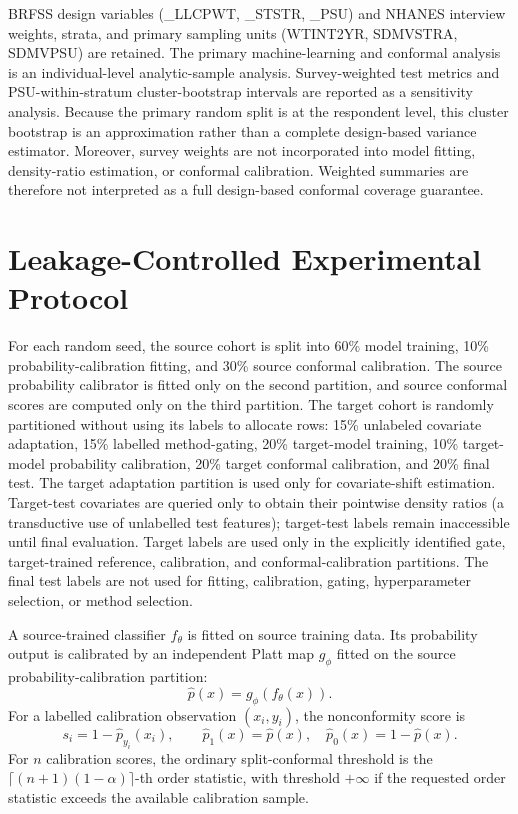 BRFSS design variables (_LLCPWT, _STSTR, _PSU) and NHANES interview weights,
strata, and primary sampling units (WTINT2YR, SDMVSTRA, SDMVPSU) are retained.
The primary machine-learning and conformal analysis is an individual-level
analytic-sample analysis. Survey-weighted test metrics and PSU-within-stratum
cluster-bootstrap intervals are reported as a sensitivity analysis. Because
the primary random split is at the respondent level, this cluster bootstrap is
an approximation rather than a complete design-based variance estimator.
Moreover, survey weights are not incorporated into model fitting,
density-ratio estimation, or conformal calibration. Weighted summaries are
therefore not interpreted as a full design-based conformal coverage guarantee.

\section{Leakage-Controlled Experimental Protocol}
\label{sec:protocol}

For each random seed, the source cohort is split into 60\% model training,
10\% probability-calibration fitting, and 30\% source conformal calibration.
The source probability calibrator is fitted only on the second partition, and
source conformal scores are computed only on the third partition. The target
cohort is randomly partitioned without using its labels to allocate rows:
15\% unlabeled covariate adaptation, 15\% labelled method-gating, 20\%
target-model training, 10\% target-model probability calibration, 20\%
target conformal calibration, and 20\% final test. The target adaptation
partition is used only for covariate-shift estimation. Target-test covariates are
queried only to obtain their pointwise density ratios (a transductive use of
unlabelled test features); target-test labels remain inaccessible until final
evaluation. Target labels are used
only in the explicitly identified gate, target-trained reference, calibration,
and conformal-calibration partitions. The final test labels are not used for
fitting, calibration, gating, hyperparameter selection, or method selection.

A source-trained classifier $f_\theta$ is fitted on source training data. Its
probability output is calibrated by an independent Platt map $g_\phi$ fitted on
the source probability-calibration partition:
\begin{equation}
  \widehat p(x)=g_\phi(f_\theta(x)).
\end{equation}
For a labelled calibration observation $(x_i,y_i)$, the nonconformity score is
\begin{equation}
  s_i=1-\widehat p_{y_i}(x_i),\qquad
  \widehat p_1(x)=\widehat p(x),\quad
  \widehat p_0(x)=1-\widehat p(x).
\end{equation}
For $n$ calibration scores, the ordinary split-conformal threshold is the
$\lceil(n+1)(1-\alpha)\rceil$-th order statistic, with threshold $+\infty$ if
the requested order statistic exceeds the available calibration sample.

